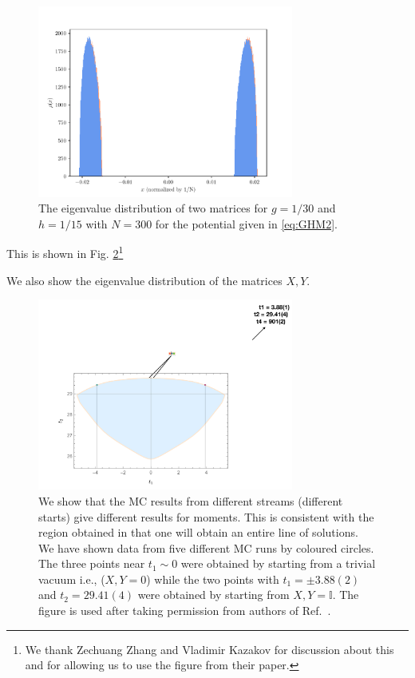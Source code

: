 \documentclass[11pt]{article}
\begin{document}
\begin{figure}[htbp] 
	\centering 
	\includegraphics[width=0.75\textwidth]{figs/2MM_dist_symbroken.pdf}
	\caption{\label{fig:2MM_evd}The eigenvalue distribution of two matrices for $g=1/30$ and $h=1/15$ 
	with $N=300$ for the potential given in \ref{eq:GHM2}.}
\end{figure}

This is shown in Fig. \ref{fig:2MM_comp1}\footnote{We thank Zechuang Zhang and Vladimir Kazakov for discussion about this and for allowing us to use the figure from their paper.}


We also show the eigenvalue distribution of the matrices $X, Y$. 

\begin{figure}[htbp] 
	\centering 
	\includegraphics[width=0.75\textwidth]{figs/2MM_symb_ms.pdf}
	\caption{\label{fig:2MM_comp1}We show that the MC results from different streams (different starts) give different results for moments. This is consistent with the region obtained in \cite{Kazakov:2021lel} that one will obtain an entire line of solutions. We have shown data from five different MC runs by coloured circles. The three points near $t_{1} \sim 0$ were obtained by starting from a trivial vacuum i.e., ($X,Y = 0$) while the two points with $t_{1} = \pm 3.88(2)$ and $t_{2}=29.41(4)$ were obtained by starting from $X,Y = \mathbb{I}$. 
The figure is used after taking permission from authors of Ref.~\cite{Kazakov:2021lel}.}

\end{figure}
\end{document}
